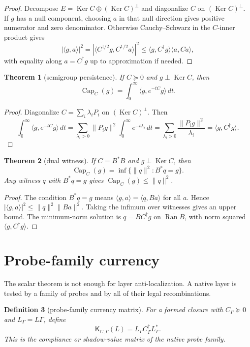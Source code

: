 \documentclass[11pt]{article}
\newtheorem{theorem}{Theorem}[section]
\newtheorem{definition}[theorem]{Definition}
\newcommand{\Capa}{\operatorname{Cap}}
\newcommand{\Ran}{\operatorname{Ran}}
\newcommand{\Ker}{\operatorname{Ker}}
\newcommand{\Kmat}{\mathsf K}
\begin{document}
\begin{proof}
Decompose $E=\Ker C\oplus (\Ker C)^\perp$ and diagonalize $C$ on $(\Ker C)^\perp$.  If $g$ has a null component, choosing $a$ in that null direction gives positive numerator and zero denominator.  Otherwise Cauchy--Schwarz in the $C$-inner product gives
\[
|\langle g,a\rangle|^2
=|\langle C^{\dagger/2}g,C^{1/2}a\rangle|^2
\le \langle g,C^\dagger g\rangle\langle a,Ca\rangle,
\]
with equality along $a=C^\dagger g$ up to approximation if needed.
\end{proof}

\begin{theorem}[semigroup persistence]
If $C\succeq0$ and $g\perp\Ker C$, then
\[
\Capa_C(g)=\int_0^\infty \langle g,e^{-tC}g\rangle\,dt.
\]
\end{theorem}

\begin{proof}
Diagonalize $C=\sum_i \lambda_i P_i$ on $(\Ker C)^\perp$.  Then
\[
\int_0^\infty \langle g,e^{-tC}g\rangle\,dt
=\sum_{\lambda_i>0}\|P_i g\|^2\int_0^\infty e^{-t\lambda_i}\,dt
=\sum_{\lambda_i>0}\frac{\|P_i g\|^2}{\lambda_i}
=\langle g,C^\dagger g\rangle.
\]
\end{proof}

\begin{theorem}[dual witness]
If $C=B^*B$ and $g\perp\Ker C$, then
\[
\Capa_C(g)=\inf\{\|q\|^2:B^*q=g\}.
\]
Any witness $q$ with $B^*q=g$ gives $\Capa_C(g)\le\|q\|^2$.
\end{theorem}

\begin{proof}
The condition $B^*q=g$ means $\langle g,a\rangle=\langle q,Ba\rangle$ for all $a$.  Hence $|\langle g,a\rangle|^2\le\|q\|^2\|Ba\|^2$.  Taking the infimum over witnesses gives an upper bound.  The minimum-norm solution is $q=B C^\dagger g$ on $\overline{\Ran B}$, with norm squared $\langle g,C^\dagger g\rangle$.
\end{proof}

\section{Probe-family currency}

The scalar theorem is not enough for layer anti-localization.  A native layer is tested by a family of probes and by all of their legal recombinations.

\begin{definition}[probe-family currency matrix]
For a formed closure with $C_\Gamma\succeq0$ and $L_\Gamma=L\Gamma$, define
\[
\boxed{\Kmat_{C,\Gamma}(L)=L_\Gamma C_\Gamma^\dagger L_\Gamma^*.}
\]
This is the compliance or shadow-value matrix of the native probe family.
\end{definition}
\end{document}
